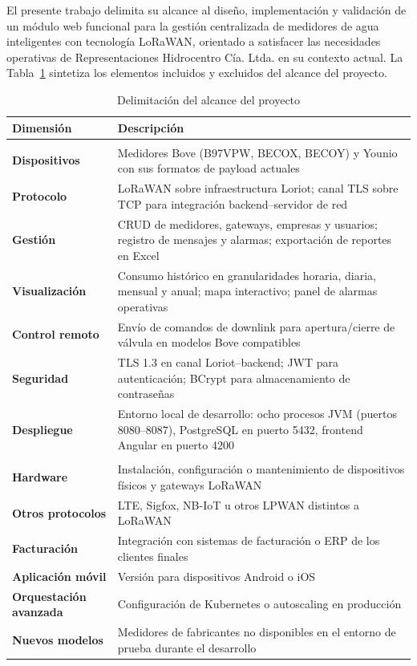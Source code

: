 \documentclass[12pt,a4paper,oneside]{report}
\begin{document}
El presente trabajo delimita su alcance al diseño, implementación y validación de un módulo web funcional para la gestión centralizada de medidores de agua inteligentes con tecnología LoRaWAN, orientado a satisfacer las necesidades operativas de Representaciones Hidrocentro Cía. Ltda. en su contexto actual. La Tabla~\ref{tab:alcance} sintetiza los elementos incluidos y excluidos del alcance del proyecto.

\begin{table}[H]
\caption{Delimitación del alcance del proyecto}
\label{tab:alcance}
\centering
\begin{tabularx}{\textwidth}{>{\bfseries}lX}
\toprule
Dimensión & Descripción \\
\midrule
\multicolumn{2}{l}{\textit{Incluido en el alcance}} \\
\midrule
Dispositivos & Medidores Bove (B97VPW, BECOX, BECOY) y Younio con sus formatos de payload actuales \\
Protocolo & LoRaWAN sobre infraestructura Loriot; canal TLS sobre TCP para integración backend--servidor de red \\
Gestión & CRUD de medidores, gateways, empresas y usuarios; registro de mensajes y alarmas; exportación de reportes en Excel \\
Visualización & Consumo histórico en granularidades horaria, diaria, mensual y anual; mapa interactivo; panel de alarmas operativas \\
Control remoto & Envío de comandos de downlink para apertura/cierre de válvula en modelos Bove compatibles \\
Seguridad & TLS 1.3 en canal Loriot--backend; JWT para autenticación; BCrypt para almacenamiento de contraseñas \\
Despliegue & Entorno local de desarrollo: ocho procesos JVM (puertos 8080--8087), PostgreSQL en puerto 5432, frontend Angular en puerto 4200 \\
\midrule
\multicolumn{2}{l}{\textit{Excluido del alcance}} \\
\midrule
Hardware & Instalación, configuración o mantenimiento de dispositivos físicos y gateways LoRaWAN \\
Otros protocolos & LTE, Sigfox, NB-IoT u otros LPWAN distintos a LoRaWAN \\
Facturación & Integración con sistemas de facturación o ERP de los clientes finales \\
Aplicación móvil & Versión para dispositivos Android o iOS \\
Orquestación avanzada & Configuración de Kubernetes o autoscaling en producción \\
Nuevos modelos & Medidores de fabricantes no disponibles en el entorno de prueba durante el desarrollo \\
\bottomrule
\end{tabularx}
\end{table}
\end{document}
